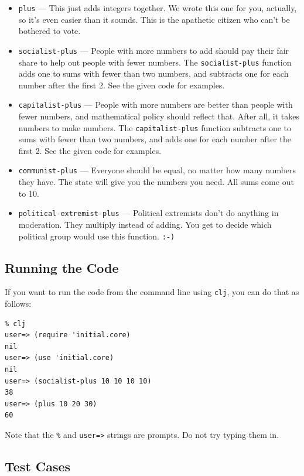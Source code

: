 \documentclass[12pt]{article}
\begin{document}
\begin{itemize}
   \item \texttt{plus} --- This just adds integers together.  We wrote this one for you, actually, so it's even
      easier than it sounds.  This is the apathetic citizen who can't be bothered to vote.
   \item \texttt{socialist-plus} ---  People with more numbers to add should pay their fair share to help out
      people with fewer numbers.  The \texttt{socialist-plus} function adds one to sums with fewer than two
      numbers, and subtracts one for each number after the first 2.  See the given code for examples.
   \item \texttt{capitalist-plus} ---  People with more numbers are better than people with fewer numbers, and
      mathematical policy should reflect that.  After all, it takes numbers to make numbers.
      The \texttt{capitalist-plus} function subtracts one to sums with fewer than two
      numbers, and adds one for each number after the first 2.  See the given code for examples.
   \item \texttt{communist-plus} --- Everyone should be equal, no matter how many numbers they have.  The state
      will give you the numbers you need.  All sums come out to 10.
   \item \texttt{political-extremist-plus} --- Political extremists don't do anything in moderation.  They
      multiply instead of adding.  You get to decide which political group would use this function. \verb|:-)|

\end{itemize}

\subsection{Running the Code}

If you want to run the code from the command line using \texttt{clj}, you can
do that as follows:

\begin{verbatim}
% clj
user=> (require 'initial.core)
nil
user=> (use 'initial.core)
nil
user=> (socialist-plus 10 10 10 10)
38
user=> (plus 10 20 30)
60
\end{verbatim}

Note that the \verb|%| and \verb|user=>| strings are prompts.
Do not try typing them in.

\subsection{Test Cases}
\end{document}
